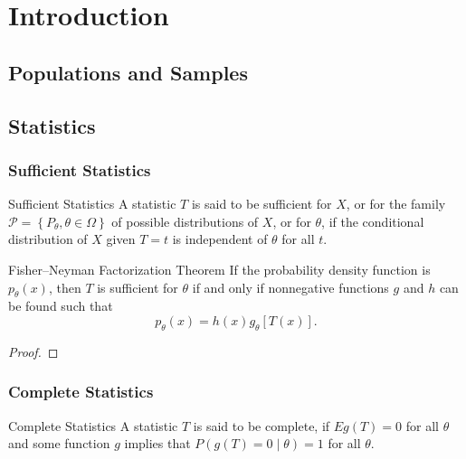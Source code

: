 \chapter{Introduction}

\section{Populations and Samples}

\section{Statistics}

\subsection{Sufficient Statistics}

\begin{definition}{Sufficient Statistics}{}
    A statistic $T$ is said to be sufficient for $X$, or for the family $\mathcal{P}=\left\{P_{\theta}, \theta \in \Omega\right\}$ of possible distributions of $X$, or for $\theta$, if the conditional distribution of $X$ given $T=t$ is independent of $\theta$ for all $t$.
\end{definition}

\begin{theorem}{Fisher–Neyman Factorization Theorem}{}
    If the probability density function is $p_{\theta}(x)$, then $T$ is sufficient for $\theta$ if and only if nonnegative functions $g$ and $h$ can be found such that
    \begin{equation*}
        p_{\theta}(x)=h(x)g_{\theta}[T(x)].
    \end{equation*}
\end{theorem}

\begin{proof}
    
\end{proof}

\subsection{Complete Statistics}

\begin{definition}{Complete Statistics}{}
    A statistic $T$ is said to be complete, if $Eg(T)=0$ for all $\theta$ and some function $g$ implies that $P(g(T)=0\mid\theta)=1$ for all $\theta$.
\end{definition}


